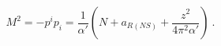 \begin{equation}
  M^2 = -p^ip_i = \frac{1}{\alpha'}
\left(N +a_{R(NS)} + \frac{z^2}{4\pi^2\alpha'}\right)\ .
\end{equation}


